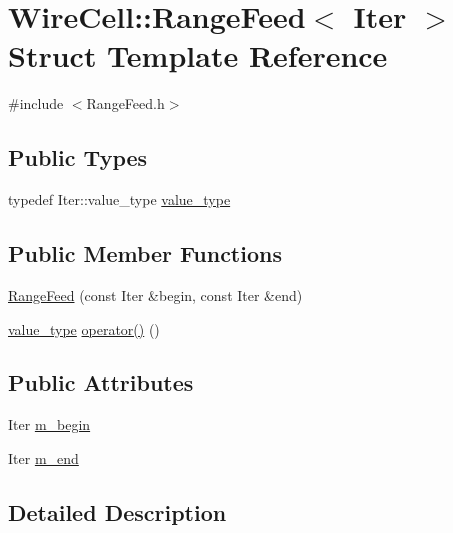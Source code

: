 \hypertarget{struct_wire_cell_1_1_range_feed}{}\section{Wire\+Cell\+:\+:Range\+Feed$<$ Iter $>$ Struct Template Reference}
\label{struct_wire_cell_1_1_range_feed}


{\ttfamily \#include $<$Range\+Feed.\+h$>$}

\subsection*{Public Types}
\begin{DoxyCompactItemize}
\item 
typedef Iter\+::value\+\_\+type \hyperlink{struct_wire_cell_1_1_range_feed_a32b94891e47c23ea05844c6bd6d0ace7}{value\+\_\+type}
\end{DoxyCompactItemize}
\subsection*{Public Member Functions}
\begin{DoxyCompactItemize}
\item 
\hyperlink{struct_wire_cell_1_1_range_feed_a6445ad7465daf6dd59c58606f11030ed}{Range\+Feed} (const Iter \&begin, const Iter \&end)
\item 
\hyperlink{struct_wire_cell_1_1_range_feed_a32b94891e47c23ea05844c6bd6d0ace7}{value\+\_\+type} \hyperlink{struct_wire_cell_1_1_range_feed_a19e1689a39c3f35ae9c121997174bdc4}{operator()} ()
\end{DoxyCompactItemize}
\subsection*{Public Attributes}
\begin{DoxyCompactItemize}
\item 
Iter \hyperlink{struct_wire_cell_1_1_range_feed_a82e91c21a7ee9836f1601c8c4866edae}{m\+\_\+begin}
\item 
Iter \hyperlink{struct_wire_cell_1_1_range_feed_a679841f5f60d11c174f35d8bc159045e}{m\+\_\+end}
\end{DoxyCompactItemize}


\subsection{Detailed Description}
